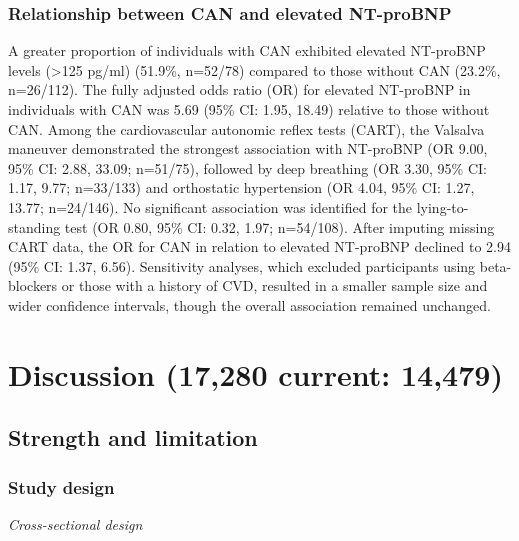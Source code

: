 \documentclass[
  a4paper,
  headsepline=true,
  open=any]{scrbook}
\begin{document}
\hypertarget{relationship-between-can-and-elevated-nt-probnp}{%
\subsection{Relationship between CAN and elevated
NT-proBNP}\label{relationship-between-can-and-elevated-nt-probnp}}

A greater proportion of individuals with CAN exhibited elevated
NT-proBNP levels (\textgreater125 pg/ml) (51.9\%, n=52/78) compared to
those without CAN (23.2\%, n=26/112). The fully adjusted odds ratio (OR)
for elevated NT-proBNP in individuals with CAN was 5.69 (95\% CI: 1.95,
18.49) relative to those without CAN. Among the cardiovascular autonomic
reflex tests (CART), the Valsalva maneuver demonstrated the strongest
association with NT-proBNP (OR 9.00, 95\% CI: 2.88, 33.09; n=51/75),
followed by deep breathing (OR 3.30, 95\% CI: 1.17, 9.77; n=33/133) and
orthostatic hypertension (OR 4.04, 95\% CI: 1.27, 13.77; n=24/146). No
significant association was identified for the lying-to-standing test
(OR 0.80, 95\% CI: 0.32, 1.97; n=54/108). After imputing missing CART
data, the OR for CAN in relation to elevated NT-proBNP declined to 2.94
(95\% CI: 1.37, 6.56). Sensitivity analyses, which excluded participants
using beta-blockers or those with a history of CVD, resulted in a
smaller sample size and wider confidence intervals, though the overall
association remained unchanged.


\hypertarget{discussion-17280-current-14479}{%
\chapter{Discussion (17,280 current:
14,479)}\label{discussion-17280-current-14479}}

\hypertarget{strength-and-limitation}{%
\section{Strength and limitation}\label{strength-and-limitation}}

\hypertarget{study-design}{%
\subsection{Study design}\label{study-design}}

\emph{Cross-sectional design}
\end{document}

